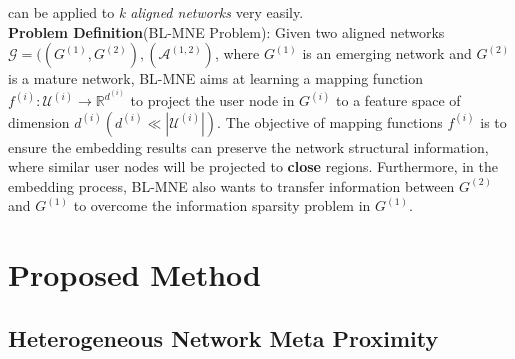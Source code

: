 \documentclass{article}
\begin{document}
can be applied to \emph{k aligned networks} very easily.\\
\textbf{Problem Definition}(BL-MNE Problem): Given two aligned networks $\mathcal{G}=((G^{(1)}, G^{(2)}), (\mathcal{A}^{(1,2)})$, where $G^{(1)}$ is an emerging network and $G^{(2)}$ is a mature network, BL-MNE aims at learning a mapping function $f^{(i)}: \mathcal{U}^{(i)}\rightarrow \mathbb{R}^{d^{(i)}}$ to project the user node in $G^{(i)}$ to a feature space of dimension $d^{(i)}(d^{(i)}\ll|\mathcal{U}^{(i)}|)$. The objective of mapping functions $f^{(i)}$ is to ensure the embedding results can preserve the network structural information, where similar user nodes will be projected to \textbf{close} regions. Furthermore, in the embedding process, BL-MNE also wants to transfer information between $G^{(2)}$ and $G^{(1)}$ to overcome the information sparsity problem in $G^{(1)}$.

\section{Proposed Method}
\subsection{Heterogeneous Network Meta Proximity}
\end{document}
